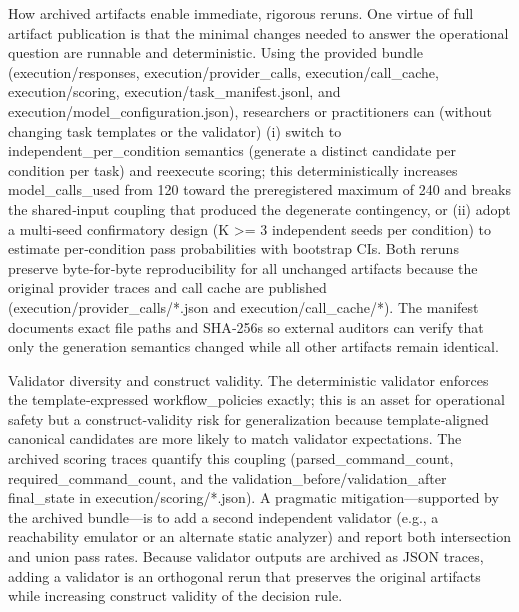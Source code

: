 \documentclass[conference]{IEEEtran}
\begin{document}
How archived artifacts enable immediate, rigorous reruns. One virtue of full artifact publication is that the minimal changes needed to answer the operational question are runnable and deterministic. Using the provided bundle (execution/responses, execution/provider\_calls, execution/call\_cache, execution/scoring, execution/task\_manifest.jsonl, and execution/model\_configuration.json), researchers or practitioners can (without changing task templates or the validator) (i) switch to independent\_per\_condition semantics (generate a distinct candidate per condition per task) and reexecute scoring; this deterministically increases model\_calls\_used from 120 toward the preregistered maximum of 240 and breaks the shared‑input coupling that produced the degenerate contingency, or (ii) adopt a multi‑seed confirmatory design (K >= 3 independent seeds per condition) to estimate per‑condition pass probabilities with bootstrap CIs. Both reruns preserve byte‑for‑byte reproducibility for all unchanged artifacts because the original provider traces and call cache are published (execution/provider\_calls/*.json and execution/call\_cache/*). The manifest documents exact file paths and SHA‑256s so external auditors can verify that only the generation semantics changed while all other artifacts remain identical.

Validator diversity and construct validity. The deterministic validator enforces the template‑expressed workflow\_policies exactly; this is an asset for operational safety but a construct‑validity risk for generalization because template‑aligned canonical candidates are more likely to match validator expectations. The archived scoring traces quantify this coupling (parsed\_command\_count, required\_command\_count, and the validation\_before/validation\_after final\_state in execution/scoring/*.json). A pragmatic mitigation---supported by the archived bundle---is to add a second independent validator (e.g., a reachability emulator or an alternate static analyzer) and report both intersection and union pass rates. Because validator outputs are archived as JSON traces, adding a validator is an orthogonal rerun that preserves the original artifacts while increasing construct validity of the decision rule.
\end{document}
